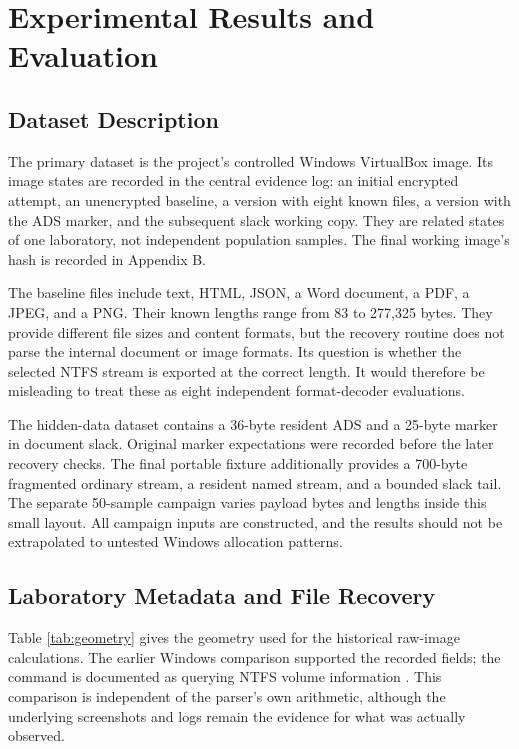 \chapter{Experimental Results and Evaluation}
\section{Dataset Description}
The primary dataset is the project's controlled Windows VirtualBox image.
Its image states are recorded in the central evidence log: an initial
encrypted attempt, an unencrypted baseline, a version with eight known
files, a version with the ADS marker, and the subsequent slack working copy.
They are related states of one laboratory, not independent population
samples. The final working image's hash is recorded in Appendix B.

The baseline files include text, HTML, JSON, a Word document, a PDF, a JPEG,
and a PNG. Their known lengths range from 83 to 277,325 bytes. They provide
different file sizes and content formats, but the recovery routine does not
parse the internal document or image formats. Its question is whether the
selected NTFS stream is exported at the correct length. It would therefore
be misleading to treat these as eight independent format-decoder evaluations.

The hidden-data dataset contains a 36-byte resident ADS and a 25-byte marker
in document slack. Original marker expectations were recorded before the
later recovery checks. The final portable fixture additionally provides a
700-byte fragmented ordinary stream, a resident named stream, and a bounded
slack tail. The separate 50-sample campaign varies payload bytes and lengths
inside this small layout. All campaign inputs are constructed, and the
results should not be extrapolated to untested Windows allocation patterns.

\section{Laboratory Metadata and File Recovery}
Table \ref{tab:geometry} gives the geometry used for the historical raw-image
calculations. The earlier Windows  comparison
supported the recorded fields; the command is documented as querying NTFS
volume information \cite{fsinfo}. This comparison is independent of the
parser's own arithmetic, although the underlying screenshots and logs remain
the evidence for what was actually observed.

